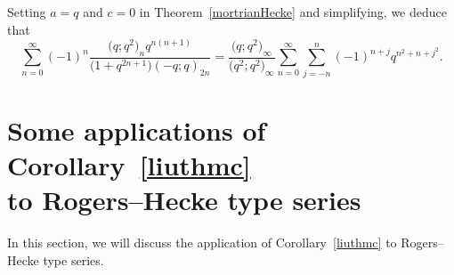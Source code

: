 \documentclass[pdftex]{sigma}
\numberwithin{equation}{section}
\begin{document}
Setting $a=q$ and $c=0$ in Theorem~\ref{mortrianHecke} and simplifying, we deduce that
\begin{equation*}%
\sum_{n=0}^\infty (-1)^n \frac{\bigl(q; q^2\bigr)_n q^{n(n+1)}}{\bigl(1+q^{2n+1}\bigr)(-q; q)_{2n}}
=\frac{\bigl(q; q^2\bigr)_\infty}{\bigl(q^2; q^2\bigr)_\infty}
\sum_{n=0}^{\infty}\sum_{j=-n}^{n}(-1)^{n+j} q^{n^2+n+j^2}.
\end{equation*}

\section[Some applications of Corollary~\ref{liuthmc} to Rogers--Hecke type series]{Some applications of Corollary~\ref{liuthmc} \\ to Rogers--Hecke type series}\label{sec6}

In this section, we will discuss the application of Corollary~\ref{liuthmc} to Rogers--Hecke type series.
\end{document}
